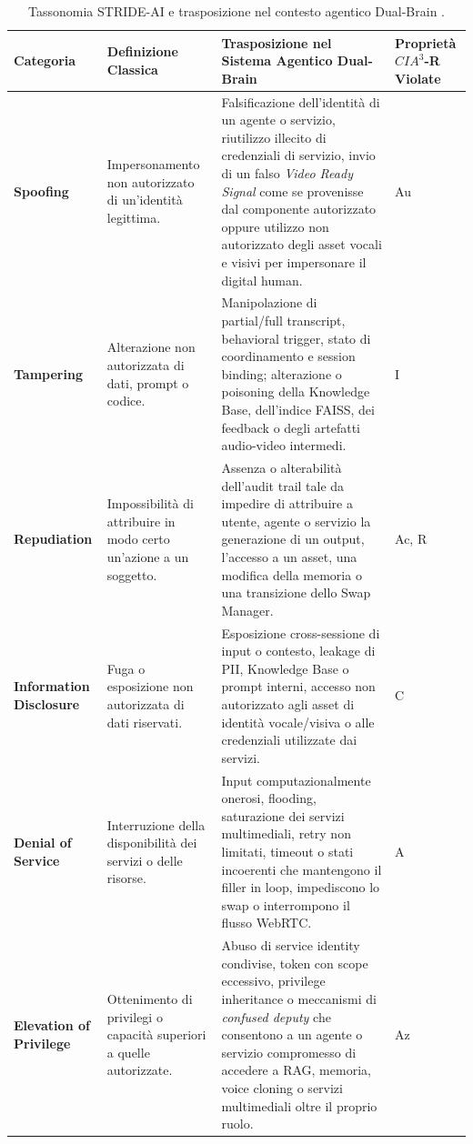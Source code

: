 \documentclass[11pt,a4paper]{article}
\begin{document}
\begin{table}[H]
\centering
\small
\caption{Tassonomia STRIDE-AI e trasposizione nel contesto agentico Dual-Brain \cite{mauri2021strideai}.}
\label{tab:stride-ai-overview}

\begin{tabularx}{\textwidth}{|L{2.5cm}|L{3.7cm}|Y|C{2.0cm}|}
\hline

\textbf{Categoria} &
\textbf{Definizione Classica} &
\textbf{Trasposizione nel Sistema Agentico Dual-Brain} &
\textbf{Proprietà $CIA^3$-R Violate}
\\ \hline

\textbf{Spoofing} &
Impersonamento non autorizzato di un'identità legittima. &
Falsificazione dell'identità di un agente o servizio, riutilizzo
illecito di credenziali di servizio, invio di un falso
\emph{Video Ready Signal} come se provenisse dal componente autorizzato
oppure utilizzo non autorizzato degli asset vocali e visivi per
impersonare il digital human. &
Au
\\ \hline

\textbf{Tampering} &
Alterazione non autorizzata di dati, prompt o codice. &
Manipolazione di partial/full transcript, behavioral trigger, stato di
coordinamento e session binding; alterazione o poisoning della
Knowledge Base, dell'indice FAISS, dei feedback o degli artefatti
audio-video intermedi. &
I
\\ \hline

\textbf{Repudiation} &
Impossibilità di attribuire in modo certo un'azione a un soggetto. &
Assenza o alterabilità dell'audit trail tale da impedire di attribuire
a utente, agente o servizio la generazione di un output, l'accesso a un
asset, una modifica della memoria o una transizione dello Swap Manager. &
Ac, R
\\ \hline

\textbf{Information Disclosure} &
Fuga o esposizione non autorizzata di dati riservati. &
Esposizione cross-sessione di input o contesto, leakage di PII,
Knowledge Base o prompt interni, accesso non autorizzato agli asset di
identità vocale/visiva o alle credenziali utilizzate dai servizi. &
C
\\ \hline

\textbf{Denial of Service} &
Interruzione della disponibilità dei servizi o delle risorse. &
Input computazionalmente onerosi, flooding, saturazione dei servizi
multimediali, retry non limitati, timeout o stati incoerenti che
mantengono il filler in loop, impediscono lo swap o interrompono il
flusso WebRTC. &
A
\\ \hline

\textbf{Elevation of Privilege} &
Ottenimento di privilegi o capacità superiori a quelle autorizzate. &
Abuso di service identity condivise, token con scope eccessivo,
privilege inheritance o meccanismi di \emph{confused deputy} che
consentono a un agente o servizio compromesso di accedere a RAG,
memoria, voice cloning o servizi multimediali oltre il proprio ruolo. &
Az
\\ \hline

\end{tabularx}
\end{table}
\end{document}
